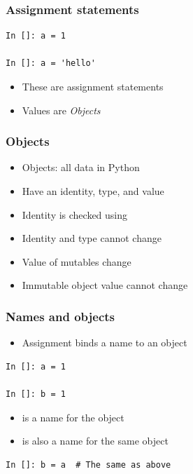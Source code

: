\documentclass[14pt,compress,aspectratio=169]{beamer}
\begin{document}
\begin{frame}[fragile]
  \frametitle{Assignment statements}
  \begin{lstlisting}
In []: a = 1

In []: a = 'hello'
\end{lstlisting}
\begin{itemize}
\item These are assignment statements
\item Values are \emph{Objects}
\end{itemize}
\end{frame}

\begin{frame}
  \frametitle{Objects}
  \begin{itemize}
  \item Objects: all data in Python
  \item Have an identity, type, and value
  \item Identity is checked using 
  \item Identity and type cannot change
  \item Value of mutables change
  \item Immutable object value cannot change
  \end{itemize}
\end{frame}

\begin{frame}[fragile]
  \frametitle{Names and objects}
  \begin{itemize}
  \item Assignment binds a name to an object
  \end{itemize}
  \begin{lstlisting}
In []: a = 1

In []: b = 1
  \end{lstlisting}
  \begin{itemize}
  \item {} is a name for the object 
  \item {} is also a name for the same object 
  \end{itemize}
  \begin{lstlisting}
In []: b = a  # The same as above
\end{lstlisting}
\end{frame}
\end{document}
